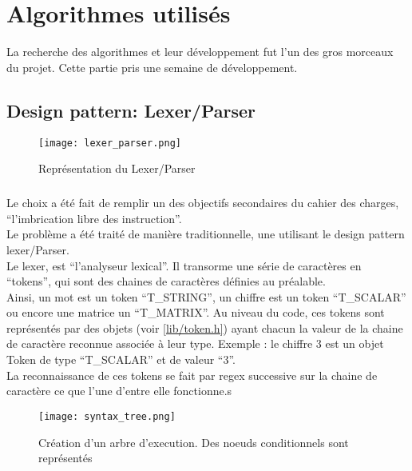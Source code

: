 \chapter{Algorithmes utilisés}
    La recherche des algorithmes et leur développement fut l'un des gros morceaux du projet. Cette partie pris une semaine de développement.

    \section{Design pattern: Lexer/Parser}
        \begin{figure}[h]
            \begin{center}
                \texttt{[image: lexer\_parser.png]}
            \end{center}

            \caption{Représentation du Lexer/Parser}
            \label{Représentation du Lexer/Parser}
        \end{figure}

        \paragraph{}
            Le choix a été fait de remplir un des objectifs secondaires du cahier des charges, ``l'imbrication libre des instruction''.
            \\ Le problème a été traité de manière traditionnelle, une utilisant le design pattern lexer/Parser.
            \\ Le lexer, est ``l'analyseur lexical''. Il transorme une série de caractères en ``tokens'', qui sont des chaines de caractères définies au préalable.
            \\ Ainsi, un mot est un token ``T\_STRING'', un chiffre est un token ``T\_SCALAR'' ou encore une matrice un ``T\_MATRIX''. Au niveau du code, ces tokens sont représentés par des objets (voir \ref{lib/token.h}) ayant chacun la valeur de la chaine de caractère reconnue associée à leur type. Exemple : le chiffre 3 est un objet Token de type ``T\_SCALAR'' et de valeur ``3''.
            \\ La reconnaissance de ces tokens se fait par regex successive sur la chaine de caractère ce que l'une d'entre elle fonctionne.s
      
            \begin{figure}[h]
                \begin{center}
                    \texttt{[image: syntax\_tree.png]}
                \end{center}

                \caption{Création d'un arbre d'execution. Des noeuds conditionnels sont représentés}
                \label{Représentation arbre syntaxique}
            \end{figure}

